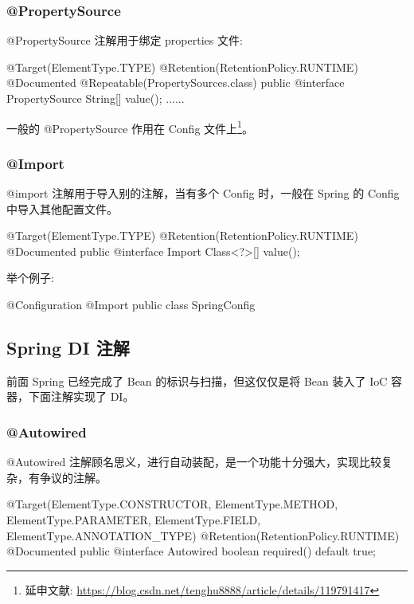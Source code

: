 \subsubsection{@PropertySource}

@PropertySource 注解用于绑定 properties 文件:

\begin{Java}
@Target(ElementType.TYPE)
@Retention(RetentionPolicy.RUNTIME)
@Documented
@Repeatable(PropertySources.class)
public @interface PropertySource {
    String[] value();
    ......
}
\end{Java}

一般的 @PropertySource 作用在 Config 文件上\footnote{延申文献: \url{https://blog.csdn.net/tenghu8888/article/details/119791417}}。

\subsubsection{@Import}

@import 注解用于导入别的注解，当有多个 Config 时，一般在 Spring 的 Config 中导入其他配置文件。

\begin{Java}
@Target(ElementType.TYPE)
@Retention(RetentionPolicy.RUNTIME)
@Documented
public @interface Import {
    Class<?>[] value();
}
\end{Java}

举个例子:

\begin{Java}
@Configuration
@Import
public class SpringConfig
\end{Java}

\subsection{Spring DI 注解}

前面 Spring 已经完成了 Bean 的标识与扫描，但这仅仅是将 Bean 装入了 IoC 容器，下面注解实现了 DI。

\subsubsection{@Autowired}

@Autowired 注解顾名思义，进行自动装配，是一个功能十分强大，实现比较复杂，有争议的注解。

\begin{Java}
@Target({ElementType.CONSTRUCTOR, ElementType.METHOD, ElementType.PARAMETER, ElementType.FIELD, ElementType.ANNOTATION_TYPE})
@Retention(RetentionPolicy.RUNTIME)
@Documented
public @interface Autowired {
    boolean required() default true;
}    
\end{Java}

